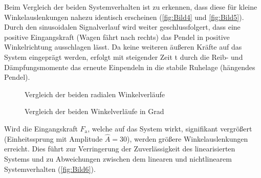 Beim Vergleich der beiden Systemverhalten ist zu erkennen, dass diese für kleine Winkelauslenkungen nahezu identisch erscheinen (\autoref{fig:Bild4} und \autoref{fig:Bild5}). Durch den sinusoidalen Signalverlauf wird weiter geschlussfolgert, dass eine positive Eingangskraft (Wagen fährt nach rechts) das Pendel in positive Winkelrichtung ausschlagen lässt. Da keine weiteren äußeren Kräfte auf das System eingeprägt werden, erfolgt mit steigender Zeit t durch die Reib- und Dämpfungsmomente das erneute Einpendeln in die stabile Ruhelage (hängendes Pendel).

\begin{figure}[H]
   \centering
   \caption[Vergleich der beiden radialen Winkelverläufe]{Vergleich der beiden radialen Winkelverläufe}
   \label{fig:Bild4}
\end{figure}

\begin{figure}[H]
    \centering
    \caption[Vergleich der beiden Winkelverläufe in Grad]{Vergleich der beiden Winkelverläufe in Grad}
    \label{fig:Bild5}
\end{figure}
\clearpage
Wird die Eingangskraft $F_{\mathrm{a}}$, welche auf das System wirkt, signifikant vergrößert (Einheitssprung mit Amplitude $\hat{A} = 30$), werden größere Winkelauslenkungen erreicht. Dies führt zur Verringerung der Zuverlässigkeit des linearisierten Systems und zu Abweichungen zwischen dem linearen und nichtlinearem Systemverhalten (\autoref{fig:Bild6}).

